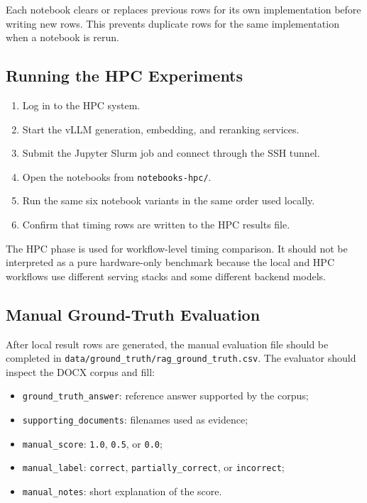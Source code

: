 Each notebook clears or replaces previous rows for its own implementation before writing new rows. This prevents duplicate rows for the same implementation when a notebook is rerun.

\subsection*{Running the HPC Experiments}

\begin{enumerate}
    \item Log in to the \ac{HPC} system.
    \item Start the vLLM generation, embedding, and reranking services.
    \item Submit the Jupyter Slurm job and connect through the SSH tunnel.
    \item Open the notebooks from \texttt{notebooks-hpc/}.
    \item Run the same six notebook variants in the same order used locally.
    \item Confirm that timing rows are written to the \ac{HPC} results file.
\end{enumerate}

The \ac{HPC} phase is used for workflow-level timing comparison. It should not be interpreted as a pure hardware-only benchmark because the local and \ac{HPC} workflows use different serving stacks and some different backend models.

\subsection*{Manual Ground-Truth Evaluation}

After local result rows are generated, the manual evaluation file should be completed in \texttt{data/ground\_truth/rag\_ground\_truth.csv}. The evaluator should inspect the DOCX corpus and fill:

\begin{itemize}
    \item \texttt{ground\_truth\_answer}: reference answer supported by the corpus;
    \item \texttt{supporting\_documents}: filenames used as evidence;
    \item \texttt{manual\_score}: \texttt{1.0}, \texttt{0.5}, or \texttt{0.0};
    \item \texttt{manual\_label}: \texttt{correct}, \texttt{partially\_correct}, or \texttt{incorrect};
    \item \texttt{manual\_notes}: short explanation of the score.
\end{itemize}

